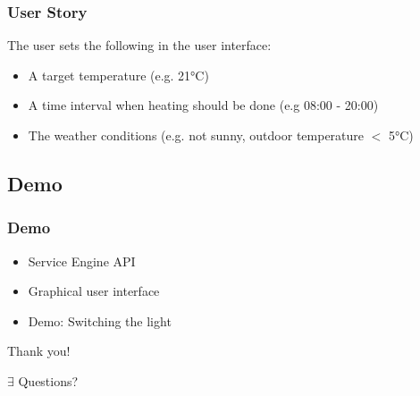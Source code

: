 \documentclass[aspectratio=169]{beamer}
\begin{document}
\begin{frame}
\frametitle{User Story}
The user sets the following in the user interface:
\begin{itemize}
\item A target temperature (e.g. 21°C)
\item A time interval when heating should be done (e.g 08:00 - 20:00)
\item The weather conditions (e.g. not sunny, outdoor temperature  $<$ 5°C)
\end{itemize}
\end{frame}

\subsection{Demo}
\begin{frame}
\frametitle{Demo}

\begin{itemize}
 \item Service Engine API
 \item Graphical user interface
 \item Demo: Switching the light
\end{itemize}
\end{frame}

\begin{frame}
\Huge{\centerline{Thank you!}}
\Huge{\centerline{$\exists$ Questions?}}
\end{frame}
\end{document}
